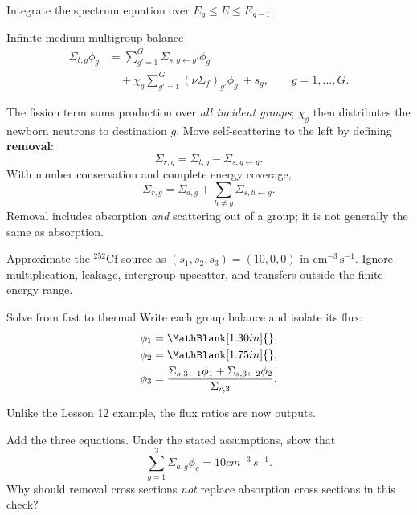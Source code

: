 \begin{handoutcolumns}
\switchcolumn
\RaggedRight
{}
Integrate the spectrum equation over $E_g\le E\le E_{g-1}$:
\begin{fixedbox}{Infinite-medium multigroup balance}
\begin{align*}
 \Sigma_{t,g}\phi_g
 &=\sum_{g'=1}^G\Sigma_{s,g\gets g'}\phi_{g'}\\
 &\quad+\chi_g\sum_{g'=1}^G(\nu\Sigma_f)_{g'}\phi_{g'}+s_g,
 \qquad g=1,\ldots,G.
\end{align*}
\end{fixedbox}
The fission term sums production over \emph{all incident groups};
$\chi_g$ then distributes the newborn neutrons to destination $g$.
Move self-scattering to the left by defining \textbf{removal}:
\[
 \boxed{\Sigma_{r,g}=\Sigma_{t,g}-\Sigma_{s,g\gets g}}.
\]
With number conservation and complete energy coverage,
\[
 \Sigma_{r,g}=\Sigma_{a,g}
      +\sum_{h\ne g}\Sigma_{s,h\gets g}.
\]
Removal includes absorption \emph{and} scattering out of a group;
it is not generally the same as absorption.

Approximate the ${}^{252}$Cf source as $(s_1,s_2,s_3)=(10,0,0)$
in $\mathrm{cm^{-3}\,s^{-1}}$. Ignore multiplication, leakage,
intergroup upscatter, and transfers outside the finite energy range.
\begin{boardbox}{Solve from fast to thermal}
Write each group balance and isolate its flux:
\begin{align*}
 \phi_1&=\MathBlank[1.30in]{},\\
 \phi_2&=\MathBlank[1.75in]{},\\
 \phi_3&=\frac{\Sigma_{s,3\gets1}\phi_1
                  +\Sigma_{s,3\gets2}\phi_2}{\Sigma_{r,3}}.
\end{align*}
\end{boardbox}
Unlike the Lesson 12 example, the flux ratios are now outputs.
\begin{checkpoint}
Add the three equations. Under the stated assumptions, show that
\[
 \sum_{g=1}^3\Sigma_{a,g}\phi_g=10\unit{cm^{-3}\,s^{-1}}.
\]
Why should removal cross sections \emph{not} replace absorption
cross sections in this check?
\end{checkpoint}
\end{handoutcolumns}


